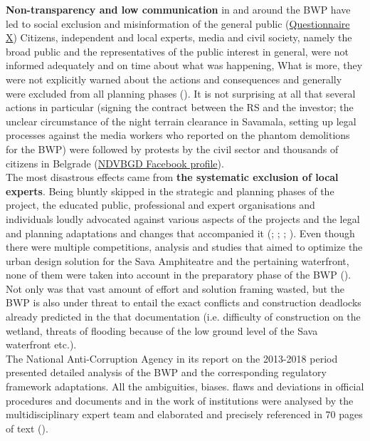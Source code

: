 \documentclass[11pt]{report}
\begin{document}
{{{{\textbf{Non-transparency and low communication} in and around the BWP have led to social exclusion and misinformation of the general public
(\href{Questionnaire Experts Savamala}{Questionnaire X})
Citizens, independent and local experts, media and civil society, namely the broad public and the representatives of the public interest in general, were not informed adequately and on time about what was happening,
What is more, they were not explicitly warned about the actions and consequences and generally were excluded from all planning phases
(\href{ref}{\citealt{ministarstvo_prostora_urbani_2014}}). 
It is not surprising at all that several actions in particular (signing the contract between the RS and the investor; the unclear circumstance of the night terrain clearance in Savamala, setting up legal processes against the media workers who reported on the phantom demolitions for the BWP) were followed by protests by the civil sector and thousands of citizens in Belgrade (\href{NDVBGD}{NDVBGD Facebook profile}).
\\

The most disastrous effects came from \textbf{the systematic exclusion of local experts}.
Being bluntly skipped in the strategic and planning phases of the project, the educated public, professional and expert organisations and individuals loudly advocated against various aspects of the projects and the legal and planning adaptations and changes that accompanied it 
(\href{ref}{\citealt{stojkov_crne_2015}}; \href{ref}{\citealt{stojkov_zaboravljene_2015}}; \href{ref}{\citealt{stojkov_sahrana_2015}}; \href{ref}{\citealt{stojkov_djindjuve_2015}}).
Even though there were multiple competitions, analysis and studies that aimed to optimize the urban design solution for the Sava Amphiteatre and the pertaining waterfront, none of them were taken into account in the preparatory phase of the BWP (\href{SANU}{\citealt{sanu_nacrt_2014}}).
Not only was that vast amount of effort and solution framing wasted, but the BWP is also under threat to entail the exact conflicts and construction deadlocks already predicted in the that documentation (i.e. difficulty of construction on the wetland, threats of flooding because of the low ground level of the Sava waterfront etc.).
\\

The National Anti-Corruption Agency in its report on the 2013-2018 period presented detailed analysis of the BWP and the corresponding regulatory framework adaptations. All the ambiguities, biases. flaws and deviations in official procedures and documents and in the work of institutions were analysed by the multidisciplinary expert team and elaborated and precisely referenced in 70 pages of text (\href{ref}{\citealt{pravni_skener_alternativni_2016}}).
\\

}}}}
\end{document}
